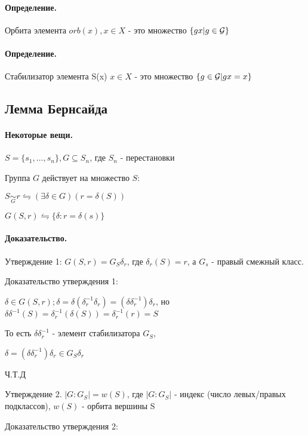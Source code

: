 \documentclass{report}
\begin{document}
\paragraph*{Определение.}
Орбита элемента $orb(x), x \in X$ - это множество $\{gx | g \in {\cal G}\} $ 

\paragraph*{Определение.}
Стабилизатор элемента S(x) $x \in X$ - это множество $\{g \in {\cal G} | gx = x\} $ 


\subsection{Лемма Бернсайда}
\paragraph*{Некоторые вещи.}
$S = \{s_1,\ldots,s_{n}\}, G \subseteq S_{n}$, где $S_{n}$ - перестановки

Группа $G$ действует на множество  $S$:

$S \underset{G}{\sim} r \leftrightharpoons (\exists  \delta \in G)(r =\delta(S))$

\medskip

$G(S,r) \leftrightharpoons \{\delta: r = \delta(s)\} $

\paragraph*{Доказательство.}
Утверждение 1: $G(S,r) = G_{S}\delta_{r}$, где $\delta_{r}(S) = r$, а $G_{s}$ -
правый смежный класс.

Доказательство утверждения 1:

$\delta \in G(S,r); \delta = \delta(\delta_{r}^{-1}\delta_{r}) = 
(\delta\delta_{r}^{-1})\delta_{r}$, но $\delta\delta^{-1}(S) = \delta^{-1}_{r}(\delta(S)) = 
\delta_{r}^{-1}(r) = S$ 

То есть $\delta\delta^{-1}_{r}$ - элемент стабилизатора $G_{S}$,

$\delta = (\delta\delta^{-1}_{r})\delta_{r} \in G_{S}\delta_{r}$ 

Ч.Т.Д

\medskip

Утверждение 2. $|G:G_{S}| = w(S)$, где $|G:G_{S}|$ - индекс (число левых/правых подклассов),
$w(S)$ - орбита вершины S

Доказательство утверждения 2:
\end{document}
